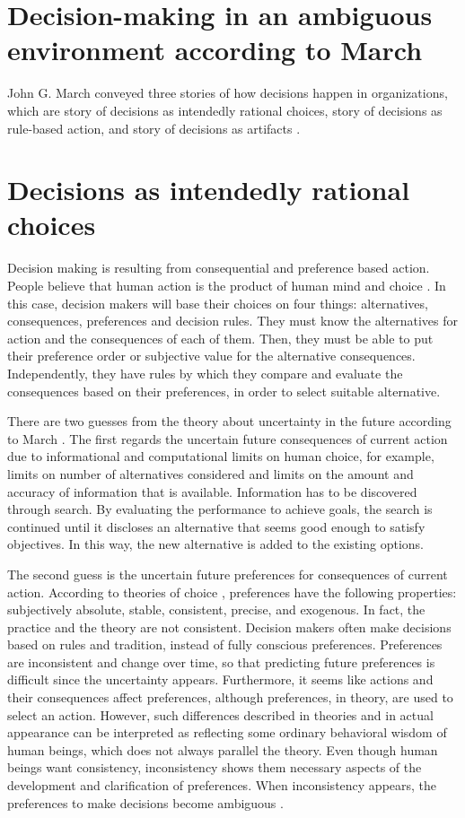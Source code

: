 \section{Decision-making in an ambiguous environment according to March}

John G. March conveyed three stories of how decisions happen in organizations, which are story of decisions as intendedly rational choices, story of decisions as rule-based action, and story of decisions as artifacts \cite{2}.

\section{Decisions as intendedly rational choices}

Decision making is resulting from consequential and preference based action. People believe that human action is the product of human mind and choice \cite{6}. In this case, decision makers will base their choices on four things: alternatives, consequences, preferences and decision rules. They must know the alternatives for action and the consequences of each of them. Then, they must be able to put their preference order or subjective value for the alternative consequences. Independently, they have rules by which they compare and evaluate the consequences based on their preferences, in order to select suitable alternative.

There are two guesses from the theory about uncertainty in the future according to March \cite{2}. The first regards the uncertain future consequences of current action due to informational and computational limits on human choice, for example, limits on number of alternatives considered and limits on the amount and accuracy of information that is available. Information has to be discovered through search. By evaluating the performance to achieve goals, the search is continued until it discloses an alternative that seems good enough to satisfy objectives. In this way, the new alternative is added to the existing options.

The second guess is the uncertain future preferences for consequences of current action. According to theories of choice \cite{2}, preferences have the following properties: subjectively absolute, stable, consistent, precise, and exogenous. In fact, the practice and the theory are not consistent. Decision makers often make decisions based on rules and tradition, instead of fully conscious preferences. Preferences are inconsistent and change over time, so that predicting future preferences is difficult since the uncertainty appears. Furthermore, it seems like actions and their consequences affect preferences, although preferences, in theory, are used to select an action. However, such differences described in theories and in actual appearance can be interpreted as reflecting some ordinary behavioral wisdom of human beings, which does not always parallel the theory. Even though human beings want consistency, inconsistency shows them necessary aspects of the development and clarification of preferences. When inconsistency appears, the preferences to make decisions become ambiguous \cite{6}.

